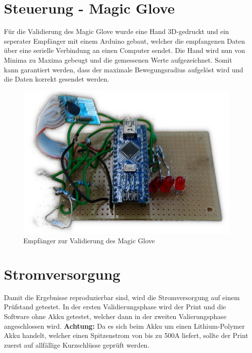 \section{Steuerung - Magic Glove} \label{ValidSteuerMagicGlove}
Für die Validierung des Magic Glove wurde eine Hand 3D-gedruckt und ein seperater Empfänger mit einem Arduino gebaut, welcher die empfangenen Daten über eine serielle Verbindung an einen Computer sendet. Die Hand wird nun von Minima zu Maxima gebeugt und die gemessenen Werte aufgezeichnet. Somit kann garantiert werden, dass der maximale Bewegungsradius aufgelöst wird und die Daten korrekt gesendet werden.
\begin{figure} [H]
	\centering
	\includegraphics[scale=0.2]{images/receiver}
	\caption{Empfänger zur Validierung des Magic Glove}
	\label{fig:statediagrammbatteri}
\end{figure}
\section{Stromversorgung} \label{ValidStromversorgung}

Damit die Ergebnisse reproduzierbar sind, wird die Stromversorgung auf einem Prüfstand getestet. In der ersten Validierungsphase wird der Print und die Software ohne Akku getestet, welcher dann in der zweiten Valierungsphase angeschlossen wird. \textbf{Achtung:} Da es sich beim Akku um einen Lithium-Polymer Akku handelt, welcher einen Spitzenstrom von bis zu 500A liefert, sollte der Print zuerst auf allfällige Kurzschlüsse geprüft werden.   

